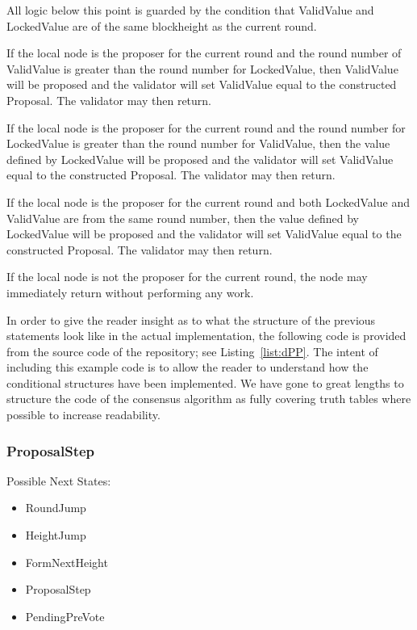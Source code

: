 All logic below this point is guarded by the condition that ValidValue
and LockedValue are of the same blockheight as the current round.

If the local node is the proposer for the current round and the round
number of ValidValue is greater than the round number for LockedValue,
then ValidValue will be proposed and the validator will set ValidValue
equal to the constructed Proposal.
The validator may then return.

If the local node is the proposer for the current round and the round
number for LockedValue is greater than the round number for ValidValue,
then the value defined by LockedValue will be proposed and the
validator will set ValidValue equal to the constructed Proposal.
The validator may then return.

If the local node is the proposer for the current round and both
LockedValue and ValidValue are from the same round number, then the
value defined by LockedValue will be proposed and the validator will
set ValidValue equal to the constructed Proposal.
The validator may then return.

If the local node is not the proposer for the current round, the node
may immediately return without performing any work.

In order to give the reader insight as to what the structure of the
previous statements look like in the actual implementation, the
following code is provided from the source code of the \LayerTwo{}
repository; see Listing~\ref{list:dPP}.
The intent of including this example code is to allow the reader to
understand how the conditional structures have been implemented.
We have gone to great lengths to structure the code of the consensus
algorithm as fully covering truth tables where possible to increase
readability.




\subsubsection{ProposalStep}

Possible Next States:

\begin{itemize}
    \item RoundJump
    \item HeightJump
    \item FormNextHeight
    \item ProposalStep
    \item PendingPreVote
\end{itemize}

